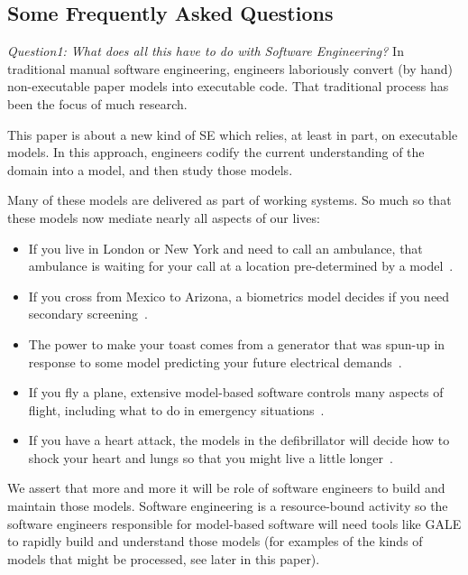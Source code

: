 \documentclass[10pt,journal,compsoc]{IEEEtran}
\newcommand{\bi}{\begin{itemize}}
\newcommand{\ei}{\end{itemize}}
\newenvironment{changed}{\par\color{MyDarkBlue}}{\par}
\begin{document}


\begin{changed}
\subsection{Some Frequently Asked Questions}\label{sec:faq} 

{\em Question1: What does all this have to do with Software Engineering?}
In  traditional manual software engineering, engineers laboriously
convert (by hand)
non-executable paper models into executable code. That traditional process
has been the focus of much research.  

This paper is about a new kind of SE which relies, at least in
part, on executable models. In this approach, engineers codify the current
understanding of the domain into a model, and then study those models.

Many of these models are delivered as part of working systems.
So much so that these models now
  mediate nearly all aspects of our lives:
\bi
\item If you
  live in London or New York and need to call an
  ambulance, that ambulance is waiting for your call
  at a location pre-determined by a model~\cite{veer11}. 
\item
If you cross from Mexico to     Arizona,
a biometrics model  decides if you need
secondary screening~\cite{Sacanamboy09}.
\item
 The power to make your toast comes from a
  generator that was spun-up in response
  to some model predicting your future electrical
  demands~\cite{808235}.  
\item
If you fly a plane, extensive
  model-based software controls many aspects of
  flight, including what to do in emergency
  situations~\cite{Kim2011}. \item
If you have a heart attack, the
   models in the defibrillator will
  decide how to shock your heart and lungs so that
  you might live a little longer~\cite{kamp99}.
\ei
We assert that more and more it will be role
of software engineers to build and maintain those models.
Software engineering is a resource-bound activity
so the software engineers responsible
 for model-based software will
need tools like GALE to rapidly build and understand those models
(for examples of the kinds of models that might be processed,
see later in this paper).



\end{changed}
\end{document}
